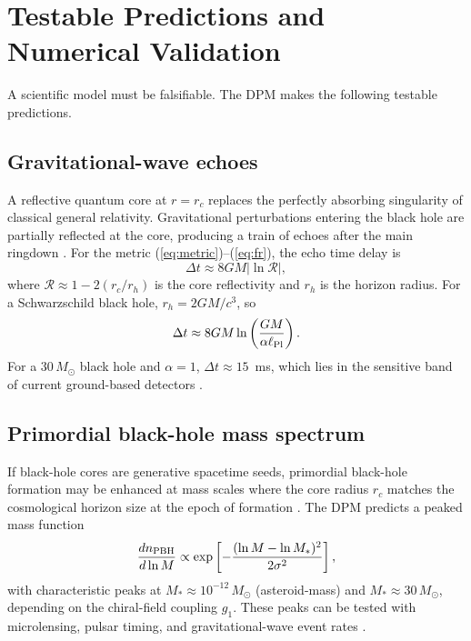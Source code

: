 \documentclass[11pt,a4paper]{article}
\begin{document}
\section{Testable Predictions and Numerical Validation}

A scientific model must be falsifiable. The DPM makes the following testable predictions.

\subsection{Gravitational-wave echoes}

A reflective quantum core at $r = r_c$ replaces the perfectly absorbing singularity of classical general relativity. Gravitational perturbations entering the black hole are partially reflected at the core, producing a train of echoes after the main ringdown \cite{cardoso2016,abedi2017,afshordi2017}. For the metric (\ref{eq:metric})--(\ref{eq:fr}), the echo time delay is
\begin{equation}
\Delta t \approx 8GM |\ln \mathcal{R}|,
\label{eq:delay}
\end{equation}
where $\mathcal{R} \approx 1 - 2(r_c/r_h)$ is the core reflectivity and $r_h$ is the horizon radius. For a Schwarzschild black hole, $r_h = 2GM/c^3$, so
\begin{equation}
\Delta t \approx 8GM \ln\left(\frac{GM}{\alpha \ell_{\rm Pl}}\right).
\label{eq:delay2}
\end{equation}
For a $30\,M_\odot$ black hole and $\alpha=1$, $\Delta t \approx 15$~ms, which lies in the sensitive band of current ground-based detectors \cite{ligo2023}.

\subsection{Primordial black-hole mass spectrum}

If black-hole cores are generative spacetime seeds, primordial black-hole formation may be enhanced at mass scales where the core radius $r_c$ matches the cosmological horizon size at the epoch of formation \cite{green2014,carr2016}. The DPM predicts a peaked mass function
\begin{equation}
\frac{dn_{\rm PBH}}{d\ln M} \propto \exp\left[ -\frac{(\ln M - \ln M_*)^2}{2\sigma^2} \right],
\label{eq:pbh}
\end{equation}
with characteristic peaks at $M_* \approx 10^{-12}\,M_\odot$ (asteroid-mass) and $M_* \approx 30\,M_\odot$, depending on the chiral-field coupling $g_1$. These peaks can be tested with microlensing, pulsar timing, and gravitational-wave event rates \cite{niikura2019}.
\end{document}
